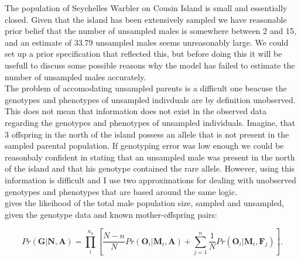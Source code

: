 \documentclass{article}
\begin{document}
The population of Seychelles Warbler on Cousin Island is small and essentially closed. Given that the island has been extensively sampled we have reasonable prior belief that the number of unsampled males is somewhere between 2 and 15, and an estimate of 33.79 unsampled males seems unreasonably large.  We could set up a prior specification that reflected this, but before doing this it will be usefull to discuss some possible reasons why the model has failed to estimate the number of unsampled males accurately.\\

The problem of accomodating unsampled parents is a difficult one beacuse the genotypes and phenotypes of unsampled indivduals are by definition unobserved. This does not mean that information does not exist in the observed data regarding the genotypes and phenotypes of unsampled individuals.  Imagine, that 3 offspring in the north of the island possess an allele that is not present in the sampled parental population. If genotyping error was low enough we could be reasonbaly confident in stating that an unsampled male was present in the north of the island and that his genotype contained the rare allele.  However, using this information is difficult and I use two approximations for dealing with unobserved genotypes and phenotypes that are based around the same logic.\\

\citet{Nielsen.2001} gives the likeihood of the total male population size, sampled and unsampled, given the genotype data and known mother-offspring pairs:

\begin{equation} 
Pr(\bm{G}|\bm{N}, \bm{A}) = \prod^{n_{o}}_{i}\left[\frac{N-n}{N}Pr(\bm{O}_{i}|\bm{M}_{i}, \bm{A}) + \sum_{j=1}^{n}\frac{1}{N}Pr(\bm{O}_{i}|\bm{M}_{i}, \bm{F}_{j})\right].
\label{Nielsen-eq}
\end{equation} 
\end{document}
